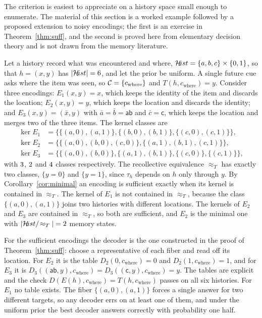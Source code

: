 The criterion is easiest to appreciate on a history space small enough to enumerate. The material of this section is a worked example followed by a proposed extension to noisy encodings; the first is an exercise in Theorem~\ref{thm:suff}, and the second is proved here from elementary decision theory and is not drawn from the memory literature.

\begin{workedex}\label{ex:finite32}
Let a history record what was encountered and where, $\mathcal{H}\!ist=\{a,b,c\}\times\{0,1\}$, so that $h=(x,y)$ has $|\mathcal{H}\!ist|=6$, and let the prior be uniform. A single future cue asks where the item was seen, so $\mathcal{C}=\{c_{\mathrm{where}}\}$ and $T(h,c_{\mathrm{where}})=y$. Consider three encodings: $E_1(x,y)=x$, which keeps the identity of the item and discards the location; $E_2(x,y)=y$, which keeps the location and discards the identity; and $E_3(x,y)=(\bar x,y)$ with $\bar a=\bar b=\mathsf{ab}$ and $\bar c=\mathsf c$, which keeps the location and merges two of the three items. The kernel classes are
\begin{align}
\ker E_1&=\bigl\{\{(a,0),(a,1)\},\{(b,0),(b,1)\},\{(c,0),(c,1)\}\bigr\},\\
\ker E_2&=\bigl\{\{(a,0),(b,0),(c,0)\},\{(a,1),(b,1),(c,1)\}\bigr\},\\
\ker E_3&=\bigl\{\{(a,0),(b,0)\},\{(a,1),(b,1)\},\{(c,0)\},\{(c,1)\}\bigr\},
\end{align}
with $3$, $2$ and $4$ classes respectively. The recollective equivalence $\approx_T$ has exactly two classes, $\{y=0\}$ and $\{y=1\}$, since $\tau_h$ depends on $h$ only through $y$. By Corollary~\ref{cor:minimal} an encoding is sufficient exactly when its kernel is contained in $\approx_T$. The kernel of $E_1$ is not contained in $\approx_T$, because the class $\{(a,0),(a,1)\}$ joins two histories with different locations. The kernels of $E_2$ and $E_3$ are contained in $\approx_T$, so both are sufficient, and $E_2$ is the minimal one with $|\mathcal{H}\!ist/\!\approx_T|=2$ memory states.

For the sufficient encodings the decoder is the one constructed in the proof of Theorem~\ref{thm:suff}: choose a representative of each fiber and read off its location. For $E_2$ it is the table $D_2(0,c_{\mathrm{where}})=0$ and $D_2(1,c_{\mathrm{where}})=1$, and for $E_3$ it is $D_3((\mathsf{ab},y),c_{\mathrm{where}})=D_3((\mathsf c,y),c_{\mathrm{where}})=y$. The tables are explicit and the check $D(E(h),c_{\mathrm{where}})=T(h,c_{\mathrm{where}})$ passes on all six histories. For $E_1$ no table exists. The fiber $\{(a,0),(a,1)\}$ forces a single answer for two different targets, so any decoder errs on at least one of them, and under the uniform prior the best decoder answers correctly with probability one half.
\end{workedex}

